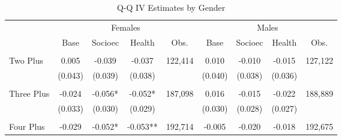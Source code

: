 \begin{table}[htpb!]\caption{Q-Q IV Estimates by Gender} 
\label{TWINtab:gend}\begin{center}\begin{tabular}{lcccccccc}
\toprule \toprule 
&\multicolumn{4}{c}{Females}&\multicolumn{4}{c}{Males}\\ 
\cmidrule(r){2-5} \cmidrule(r){6-9} 
&Base&Socioec&Health&Obs.&Base&Socioec&Health&Obs. \\ \midrule 
\begin{footnotesize}\end{footnotesize}&\begin{footnotesize}\end{footnotesize}&\begin{footnotesize}\end{footnotesize}&\begin{footnotesize}\end{footnotesize}&\begin{footnotesize}\end{footnotesize}&\begin{footnotesize}\end{footnotesize}&\\Two Plus &0.005&-0.039&-0.037&122,414&0.010&-0.010&-0.015&127,122\\
&(0.043)&(0.039)&(0.038)&&(0.040)&(0.038)&(0.036)&\\
\begin{footnotesize}\end{footnotesize}&\begin{footnotesize}\end{footnotesize}&\begin{footnotesize}\end{footnotesize}&\begin{footnotesize}\end{footnotesize}&\begin{footnotesize}\end{footnotesize}&\begin{footnotesize}\end{footnotesize}&\\Three Plus &-0.024&-0.056*&-0.052*&187,098&0.016&-0.015&-0.022&188,889\\
&(0.033)&(0.030)&(0.029)&&(0.030)&(0.028)&(0.027)&\\
\begin{footnotesize}\end{footnotesize}&\begin{footnotesize}\end{footnotesize}&\begin{footnotesize}\end{footnotesize}&\begin{footnotesize}\end{footnotesize}&\begin{footnotesize}\end{footnotesize}&\begin{footnotesize}\end{footnotesize}&\\Four Plus &-0.029&-0.052*&-0.053**&192,714&-0.005&-0.020&-0.018&192,675\\

\end{tabular}
\end{center}
\end{table}
